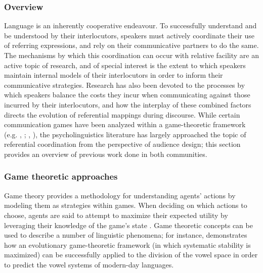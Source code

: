 \documentclass[12pt,a4paper]{article}
\begin{document}
\subsubsection{Overview}
Language is an inherently cooperative endeavour. To successfully understand and be understood by their interlocutors, speakers must actively coordinate their use of referring expressions, and rely on their communicative partners to do the same. The mechanisms by which this coordination can occur with relative facility are an active topic of research, and of special interest is the extent to which speakers maintain internal models of their interlocutors in order to inform their communicative strategies. Research has also been devoted to the processes by which speakers balance the costs they incur when communicating against those incurred by their interlocutors, and how the interplay of these combined factors directs the evolution of referential mappings during discourse. While certain communication games have been analyzed within a game-theoretic framework (e.g. \citeauthor{rohde2012}, \citeyear{rohde2012}; \citeauthor{degen2012}, \citeyear{degen2012}), the psycholinguistics literature has largely approached the topic of referential coordination from the perspective of audience design; this section provides an overview of previous work done in both communities.

\subsubsection{Game theoretic approaches}
Game theory provides a methodology for understanding agents' actions by modeling them as strategies within games. When deciding on which actions to choose, agents are said to attempt to maximize their expected utility by leveraging their knowledge of the game's state \citep{benz2005}. Game theoretic concepts can be used to describe a number of linguistic phenomena; for instance, \cite{jaeger2008} demonstrates how an evolutionary game-theoretic framework (in which systematic stability is maximized) can be successfully applied to the division of the vowel space in order to predict the vowel systems of modern-day languages.
\end{document}
